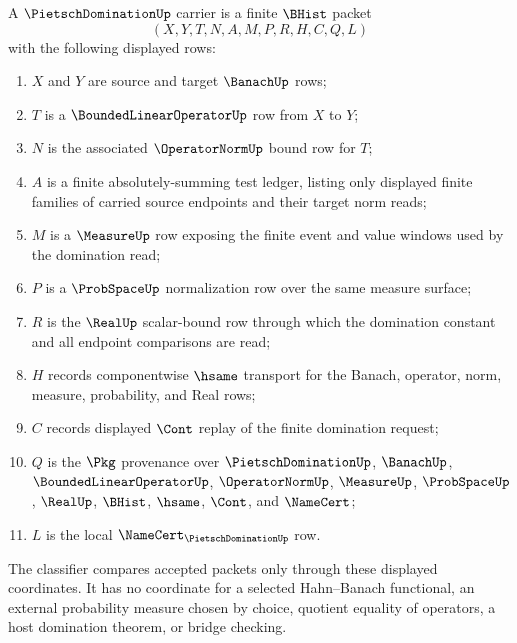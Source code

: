 \begin{definition}
\label{def:pietsch-domination-carrier}
A $\PietschDominationUp$ carrier is a finite $\BHist$ packet
$$
(X,Y,T,N,A,M,P,R,H,C,Q,L)
$$
with the following displayed rows:
\begin{enumerate}
\item $X$ and $Y$ are source and target $\BanachUp$ rows;
\item $T$ is a $\BoundedLinearOperatorUp$ row from $X$ to $Y$;
\item $N$ is the associated $\OperatorNormUp$ bound row for $T$;
\item $A$ is a finite absolutely-summing test ledger, listing only displayed finite families of carried source endpoints and their target norm reads;
\item $M$ is a $\MeasureUp$ row exposing the finite event and value windows used by the domination read;
\item $P$ is a $\ProbSpaceUp$ normalization row over the same measure surface;
\item $R$ is the $\RealUp$ scalar-bound row through which the domination constant and all endpoint comparisons are read;
\item $H$ records componentwise $\hsame$ transport for the Banach, operator, norm, measure, probability, and Real rows;
\item $C$ records displayed $\Cont$ replay of the finite domination request;
\item $Q$ is the $\Pkg$ provenance over $\PietschDominationUp$, $\BanachUp$, $\BoundedLinearOperatorUp$, $\OperatorNormUp$, $\MeasureUp$, $\ProbSpaceUp$, $\RealUp$, $\BHist$, $\hsame$, $\Cont$, and $\NameCert$;
\item $L$ is the local $\NameCert_{\PietschDominationUp}$ row.
\end{enumerate}

The classifier compares accepted packets only through these displayed coordinates. It has no coordinate for a selected Hahn--Banach functional, an external probability measure chosen by choice, quotient equality of operators, a host domination theorem, or bridge checking.
\end{definition}

